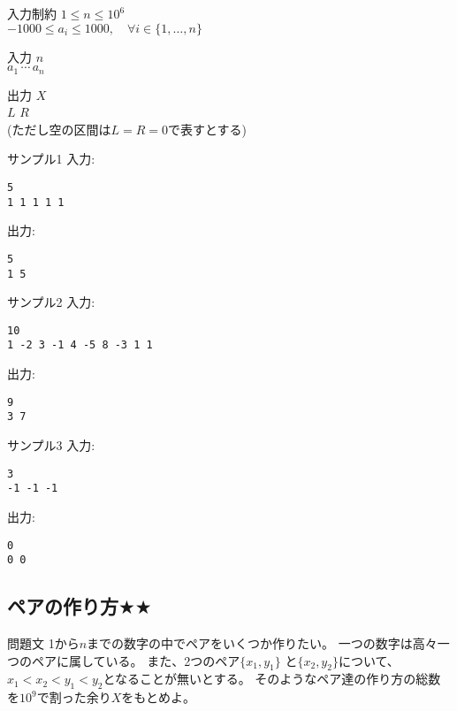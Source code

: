 \documentclass[a4paper,twoside,onecolumn,openany,article,10pt]{memoir}
\theoremstyle{remark}
\begin{document}
\begin{itembox}[l]{入力制約}
$1\le n\le 10^6$\\
$-1000\le a_i\le 1000,\quad\forall i\in\{1,\dotsc,n\}$
\end{itembox}

\begin{itembox}[l]{入力}
$n$\\
$a_1\, \cdots\, a_n$
\end{itembox}

\begin{itembox}[l]{出力}
$X$\\
$L$ $R$\\
(ただし空の区間は$L=R=0$で表すとする)
\end{itembox}

\begin{itembox}[l]{サンプル1}
入力:
\begin{verbatim}
5
1 1 1 1 1
\end{verbatim}
出力:
\begin{verbatim}
5
1 5
\end{verbatim}
\end{itembox}

\begin{itembox}[l]{サンプル2}
入力:
\begin{verbatim}
10
1 -2 3 -1 4 -5 8 -3 1 1
\end{verbatim}
出力:
\begin{verbatim}
9
3 7
\end{verbatim}
\end{itembox}

\begin{itembox}[l]{サンプル3}
入力:
\begin{verbatim}
3
-1 -1 -1
\end{verbatim}
出力:
\begin{verbatim}
0
0 0
\end{verbatim}
\end{itembox}

\clearpage
\subsection{ペアの作り方$\bigstar\bigstar$}
\begin{itembox}[l]{問題文}
1から$n$までの数字の中でペアをいくつか作りたい。
一つの数字は高々一つのペアに属している。
また、2つのペア$\{x_1, y_1\}$ と$\{x_2,y_2\}$について、
$x_1<x_2<y_1<y_2$となることが無いとする。
そのようなペア達の作り方の総数を$10^9$で割った余り$X$をもとめよ。
\end{itembox}
\end{document}
